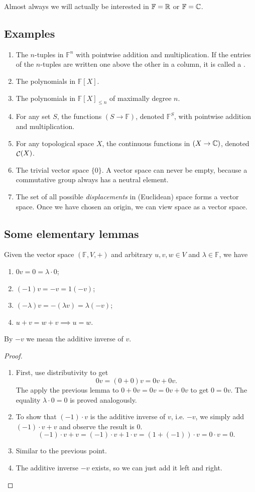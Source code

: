Almost always we will actually be interested in $\mathbb{F} = \mathbb{R}$ or $\mathbb{F} = \mathbb{C}$.
\subsection{Examples}
\begin{enumerate}
\item The $n$-tuples in $\mathbb{F}^n$ with pointwise addition and multiplication. If the entries of the $n$-tuples are written one above the other in a column, it is called a .
\item The polynomials in $\mathbb{F}[X]$.
\item The polynomials in $\mathbb{F}[X]_{\leq n}$ of maximally degree $n$.
\item For any set $S$, the functions $(S\to \mathbb{F})$, denoted $\mathbb{F}^S$, with pointwise addition and multiplication.
\item For any topological space $X$, the continuous functions in $(X\to \mathbb{C})$, denoted $\mathop{\mathcal{C}}(X)$.
\item The trivial vector space $\{ 0\}$. A vector space can never be empty, because a commutative group always has a neutral element.
\item The set of all possible \textit{displacements} in (Euclidean) space forms a vector space. Once we have chosen an origin, we can view space as a vector space.
\end{enumerate}
\subsection{Some elementary lemmas}
\begin{lemma}
Given the vector space $(\mathbb{F}, V, +)$  and arbitrary $u,v,w\in V$ and $\lambda \in \mathbb{F}$, we have
\begin{enumerate}
\item $0v = 0 = \lambda \cdot 0$;
\item $(-1)v = -v = 1(-v)$;
\item $(-\lambda)v = -(\lambda v) = \lambda(-v)$;
\item $u+v = w+v \implies u = w$.
\end{enumerate}
By $-v$ we mean the additive inverse of $v$.
\end{lemma}
\begin{proof}
\begin{enumerate}
\item First, use distributivity to get
\[ 0v = (0+0)v = 0v + 0v. \]
The apply the previous lemma to $0+0v = 0v = 0v+0v$ to get $0=0v$. The equality $\lambda\cdot 0 = 0$ is proved analogously.
\item To show that $(-1)\cdot v$ is the additive inverse of $v$, i.e. $-v$, we simply add $(-1)\cdot v + v$ and observe the result is $0$.
\[ (-1)\cdot v + v = (-1)\cdot v + 1\cdot v = (1+(-1))\cdot v = 0\cdot v = 0. \]
\item Similar to the previous point.
\item The additive inverse $-v$ exists, so we can just add it left and right.
\end{enumerate}
\end{proof}
